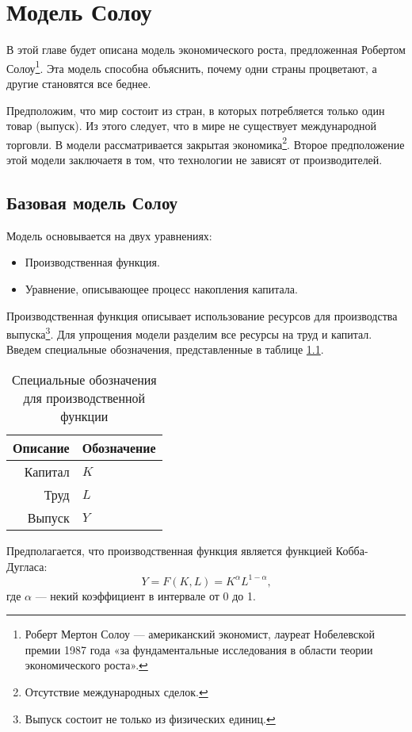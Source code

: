 \chapter{Модель Солоу}
\label{cha:solow_models}

В этой главе будет описана модель экономического роста, предложенная Робертом Солоу\footnote{Роберт Мертон Солоу --- американский экономист, лауреат Нобелевской премии 1987 года «за фундаментальные исследования в области теории экономического роста»\cite{wiki_solow}.}.
Эта модель способна объяснить, почему одни страны процветают, а другие становятся все беднее.

Предположим, что мир состоит из стран, в которых потребляется только один товар (выпуск).
Из этого следует, что в мире не существует международной торговли.
В модели рассматривается закрытая экономика\footnote{Отсутствие международных сделок.}.
Второе предположение этой модели заключаетя в том, что технологии не зависят от производителей.

\section{Базовая модель Солоу}

Модель основывается на двух уравнениях:
\begin{itemize}
	\item Производственная функция.
	\item Уравнение, описывающее процесс накопления капитала.
\end{itemize}
Производственная функция описывает использование ресурсов для производства выпуска\footnote{Выпуск состоит не только из физических единиц.}.
Для упрощения модели разделим все ресурсы на труд и капитал.
Введем специальные обозначения, представленные в таблице \ref{tab:prod_func}.
\begin{table}[ht]
	\centering
	\caption{Специальные обозначения для производственной функции}
	\begin{tabular}{|r|l|}
		\hline
		Описание & Обозначение \\ \hline
		Капитал  &      $K$    \\
		Труд     &      $L$    \\
		Выпуск   &      $Y$    \\ \hline
		\end{tabular}%
	\label{tab:prod_func}
\end{table}
Предполагается, что производственная функция является функцией Кобба-Дугласа:
\begin{equation}
	Y = F(K, L) = K^{\alpha}L^{1-\alpha}\text{,}
\label{F:Cob_Duglas}
\end{equation}
где $\alpha$ --- некий коэффициент в интервале от 0 до 1.

